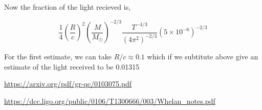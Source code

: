\documentclass[10pt,a4paper]{article}
\begin{document}
Now the fraction of the light recieved is,

\begin{equation}
\frac{1}{4} \left(\frac{R}{c}\right)^2 \left(\frac{M}{M_{\odot}}\right)^{-2/3} \frac{T^{-4/3}}{(4 \pi^2)^{-2/3}} (5 \times 10^{-6})^{-2/3}
\end{equation}

For the first estimate, we can take $R/c \approx 0.1$ which if we subtitute above give an estimate of the light received to be 0.01315 

\begin{thebibliography}{9}

				\url{https://arxiv.org/pdf/gr-qc/0103075.pdf}

 \url{https://dcc.ligo.org/public/0106/T1300666/003/Whelan_notes.pdf}
\end{thebibliography}
\end{document}
